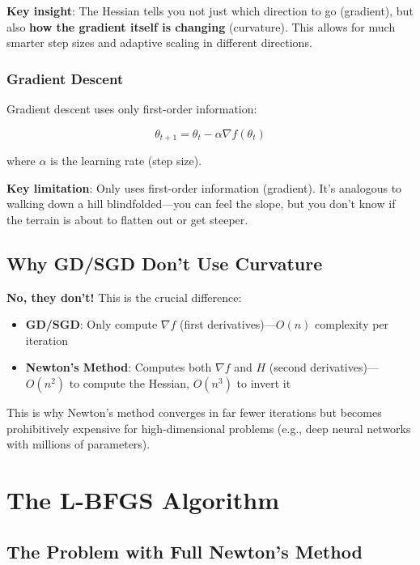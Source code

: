 \documentclass[11pt, a4paper, oneside]{article}
\begin{document}
\textbf{Key insight}: The Hessian tells you not just which direction to go (gradient), but also \textbf{how the gradient itself is changing} (curvature). This allows for much smarter step sizes and adaptive scaling in different directions.

\subsubsection{Gradient Descent}

Gradient descent uses only first-order information:

\begin{equation}
\theta_{t+1} = \theta_t - \alpha \nabla f(\theta_t)
\end{equation}

where $\alpha$ is the learning rate (step size).

\textbf{Key limitation}: Only uses first-order information (gradient). It's analogous to walking down a hill blindfolded---you can feel the slope, but you don't know if the terrain is about to flatten out or get steeper.

\subsection{Why GD/SGD Don't Use Curvature}

\textbf{No, they don't!} This is the crucial difference:

\begin{itemize}
    \item \textbf{GD/SGD}: Only compute $\nabla f$ (first derivatives)---$O(n)$ complexity per iteration
    \item \textbf{Newton's Method}: Computes both $\nabla f$ and $H$ (second derivatives)---$O(n^2)$ to compute the Hessian, $O(n^3)$ to invert it
\end{itemize}

This is why Newton's method converges in far fewer iterations but becomes prohibitively expensive for high-dimensional problems (e.g., deep neural networks with millions of parameters).

\section{The L-BFGS Algorithm}

\subsection{The Problem with Full Newton's Method}
\end{document}
